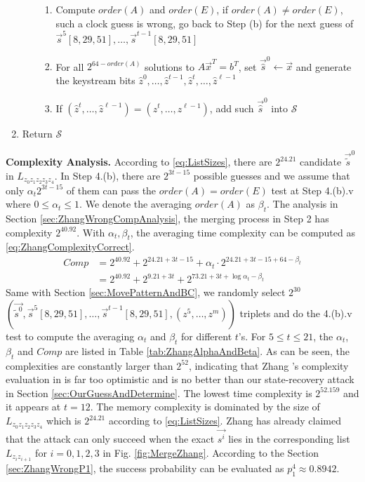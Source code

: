 \begin{enumerate}
\begin{enumerate}
\begin{enumerate}
        \item Compute $order(A)$ and $order(E)$, if $order(A)\neq order(E)$, such a clock guess is wrong, go back to Step (b) for the next guess of $\vec{s}^5[8,29,51], \ldots, \vec{s}^{t-1}[8,29,51]$
        \item For all $2^{64-order(A)}$ solutions to $A\vec x^T=b^T$, set $\vec{\hat{s}}^0\leftarrow \vec x$ and generate the keystream bits $\hat{z}^0,\ldots, \hat{z}^{t-1},\hat{z}^{t},\ldots, \hat{z}^{\ell-1}$
        \item If $(\hat{z}^{t},\ldots, \hat{z}^{\ell-1})=(z^{t},\ldots, z^{\ell-1})$, add such $\vec{\hat{s}}^0$ into $\mathcal{S}$
      \end{enumerate}
   \end{enumerate}
  \item Return $\mathcal{S}$
\end{enumerate}

\noindent\textbf{Complexity Analysis. }
According to \eqref{eq:ListSizes}, there are $2^{24.21}$ candidate $\vec{\tilde{s}}^0$ in $L_{z_0z_1z_2z_3z_4}$.
In Step 4.(b), there are $2^{3t-15}$ possible guesses and we assume that only $\alpha_t 2^{3t-15}$ of them can pass the $order(A)=order(E)$ test at Step 4.(b).v where $0\leq \alpha_t \leq 1$.
We denote the averaging $order(A)$ as $\beta_t$.
The analysis in Section \ref{sec:ZhangWrongCompAnalysis}, the merging process in Step 2 has complexity $2^{40.92}$.
With $\alpha_t ,\beta_t $, the averaging time complexity can be computed as \eqref{eq:ZhangComplexityCorrect}.
\begin{equation}\label{eq:ZhangOriginComplexity}
\begin{aligned}
Comp&=2^{40.92}+2^{24.21+3t-15}+\alpha_t \cdot 2^{24.21+3t-15+64-\beta_t}\\
&=2^{40.92}+2^{9.21+3t}+2^{73.21+3t+\log \alpha_t -\beta_t}
\end{aligned}
\end{equation}
Same with Section \ref{sec:MovePatternAndBC}, we randomly select $2^{30}$ $\left(\vec{\tilde{s}^0}, \vec{s}^5[8,29,51], \ldots, \vec{s}^{t-1}[8,29,51], (z^5,\ldots, z^m)\right)$ triplets and do the 4.(b).v test to compute the averaging $\alpha_t$ and $\beta_t$ for different $t$'s.
For $5\leq t\leq 21$, the $\alpha_t$, $\beta_t$ and $Comp$ are listed in Table \ref{tab:ZhangAlphaAndBeta}.
As can be seen, the complexities are constantly larger than $2^{52}$, indicating that Zhang \etal's complexity evaluation in \cite{AC:Zhang19} is far too optimistic and is no better than our state-recovery attack in Section \ref{sec:OurGuessAndDetermine}.
The lowest time complexity is $2^{52.159}$ and it appears at $t=12$.
The memory complexity is dominated by the size of $L_{z_0z_1z_2z_3z_4}$ which is $2^{24.21}$ according to \eqref{eq:ListSizes}.
Zhang \etal has already claimed that the attack can only succeed when the exact $\vec{s^i}$ lies in the corresponding list $L_{z_iz_{i+1}}$ for $i=0,1,2,3$ in Fig. \ref{fig:MergeZhang}.
According to the Section \ref{sec:ZhangWrongP1}, the success probability can be evaluated as $p_1^4\approx 0.8942$.

